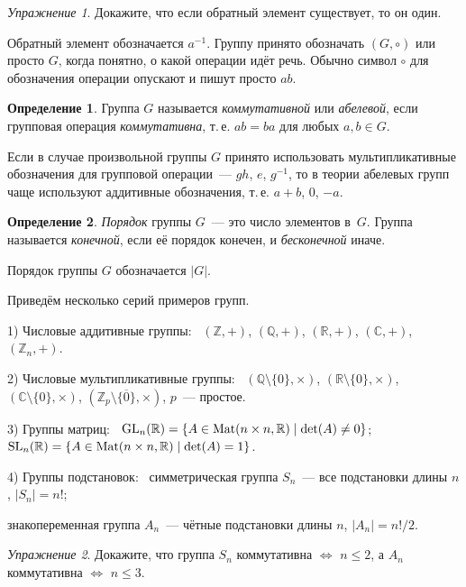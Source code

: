 \documentclass[a4paper, 12pt]{article}
\def\Mat{{\rm Mat}}%
\def\CC{{\mathbb C}}%
\def\ZZ{{\mathbb Z}}%
\def\RR{{\mathbb R}}%
\def\QQ{{\mathbb Q}}%
\def\GL{{\rm GL}}%
\def\SL{{\rm SL}}%
\def\GL{{\rm GL}}%
\def\Mat{{\rm Mat}}
\def\GL{{\rm GL}}
\def\SL{{\rm SL}}
\def\GL{{\rm GL}}
\theoremstyle{definition}
\newtheorem{definition}{Определение}
\theoremstyle{remark}
\newtheorem{exc}{Упражнение}
\begin{document}
\begin{exc}
Докажите, что если обратный элемент существует, то он один.
\end{exc}

Обратный элемент обозначается $a^{-1}$. 
Группу принято обозначать
$(G,\circ)$ или просто $G$, когда понятно, о какой операции идёт
речь. 
Обычно символ $\circ$ для обозначения операции опускают и
пишут просто $ab$.

\begin{definition}
Группа $G$ называется {\it коммутативной} или {\it абелевой}, если
групповая операция {\it коммутативна}, т.\,е. $ab=ba$ для любых
$a,b\in G$.
\end{definition}

Если в случае произвольной группы $G$ принято использовать
мультипликативные обозначения для групповой операции~--- $gh$, $e$,
$g^{-1}$, то в теории абелевых групп чаще используют аддитивные
обозначения, т.\,е. $a+b$, $0$, $-a$.

\begin{definition}
{\it Порядок} группы $G$~--- это число элементов в~$G$. 
Группа
называется {\it конечной}, если её порядок конечен, и {\it
бесконечной} иначе.
\end{definition}

Порядок группы $G$ обозначается $|G|$.

\smallskip

Приведём несколько серий примеров групп.

\smallskip

1) Числовые аддитивные группы: \ $(\ZZ,+)$, $(\QQ,+)$, $(\RR,+)$,
$(\CC,+)$, $(\ZZ_n,+)$.

\smallskip

2) Числовые мультипликативные группы: \
$(\QQ\setminus\{0\},\times)$, $(\RR\setminus\{0\},\times)$,
$(\CC\setminus\{0\},\times)$,
$(\ZZ_p\setminus\{\overline{0}\},\times)$, $p$~--- простое.

3) Группы матриц: \ $\GL_n(\RR)=\{A\in\Mat(n\times n, \RR) \mid
\det(A)\ne 0\}$;  \ $\SL_n(\RR)=\{A\in\Mat(n\times n, \RR) \mid
\det(A)=1\}$.

4) Группы подстановок: \ симметрическая группа $S_n$~--- все
подстановки длины $n$, $|S_n|=n!$;

знакопеременная группа $A_n$~--- чётные подстановки длины $n$,
$|A_n|=n!/2$.

\begin{exc}
Докажите, что группа $S_n$ коммутативна $\Leftrightarrow$ $n
\leqslant 2$, а $A_n$ коммутативна $\Leftrightarrow$ $n \leqslant
3$.
\end{exc}
\end{document}

